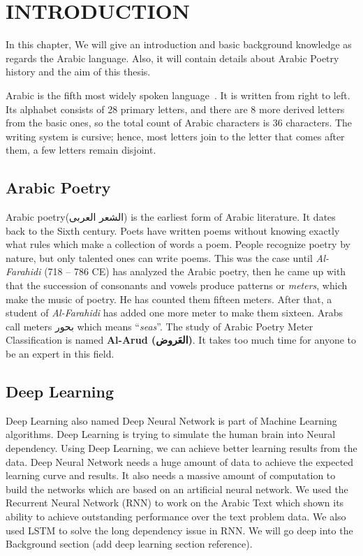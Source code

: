 \chapter{\uppercase{Introduction}}\label{Ch:Intro}



In this chapter, We will give an introduction and basic background knowledge as regards the Arabic language. Also, it will contain details about Arabic Poetry history and the aim of this thesis.

  Arabic is the fifth most widely spoken language~\cite{Ethnologue_2017}. It is written from right to left. Its
alphabet consists of 28 primary letters, and there are 8 more derived letters
from the basic ones, so the total count of Arabic characters is 36 characters.
The writing system is cursive; hence, most letters join to the letter that comes
after them, a few letters remain disjoint.

\section{Arabic Poetry } %
Arabic poetry(\textarabic{الشعر العربى}) is the earliest form of Arabic literature. It dates back to the Sixth century. Poets have written poems without knowing exactly what rules which make a collection of words a poem. People recognize poetry by nature, but only talented ones can write poems. This was the case until \textit{Al-Farahidi} (718 – 786 CE) has analyzed the
Arabic poetry, then he came up with that the succession of consonants and vowels
produce patterns or \textit{meters}, which make the music of poetry.  He has
counted them fifteen meters.  After that, a student of \textit{Al-Farahidi} has
added one more meter to make them sixteen. Arabs call meters \textarabic{بحور}
which means ``\textit{seas}''. The study of Arabic Poetry Meter Classification is named \textbf{Al-Arud (\textarabic{العَروض})}. It takes too much time for anyone to be an expert in this field. 
\section{Deep Learning}

Deep Learning also named Deep Neural Network is part of Machine Learning algorithms. Deep Learning is trying to simulate the human brain into Neural dependency.  Using Deep Learning, we can achieve better learning results from the data. Deep Neural Network needs a huge amount of data to achieve the expected learning curve and results. It also needs a massive amount of computation to build the networks which are based on an artificial neural network. We used the Recurrent Neural Network (RNN) to work on the Arabic Text which shown its ability to achieve outstanding performance over the text problem data. We also used LSTM to solve the long dependency issue in RNN. We will go deep into the Background section (add deep learning section reference).

